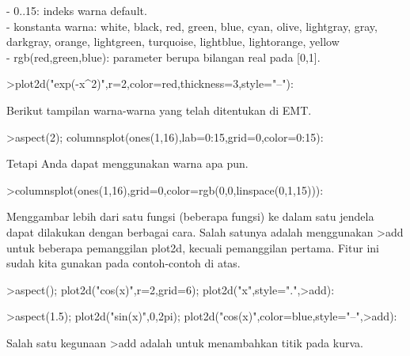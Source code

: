 \documentclass[a4paper,10pt]{article}
\begin{document}
\begin{eulernotebook}
\begin{eulercomment}
\begin{eulercomment}
\begin{eulercomment}
\begin{eulercomment}
\begin{eulercomment}
\begin{eulercomment}
\begin{eulercomment}
- 0..15: indeks warna default.\\
- konstanta warna: white, black, red, green, blue, cyan, olive,
lightgray, gray, darkgray, orange, lightgreen, turquoise, lightblue,
lightorange, yellow\\
- rgb(red,green,blue): parameter berupa bilangan real pada [0,1].
\end{eulercomment}
\begin{eulerprompt}
>plot2d("exp(-x^2)",r=2,color=red,thickness=3,style="--"):
\end{eulerprompt}
\begin{eulercomment}
Berikut tampilan warna-warna yang telah ditentukan di EMT.
\end{eulercomment}
\begin{eulerprompt}
>aspect(2); columnsplot(ones(1,16),lab=0:15,grid=0,color=0:15):
\end{eulerprompt}
\begin{eulercomment}
Tetapi Anda dapat menggunakan warna apa pun.
\end{eulercomment}
\begin{eulerprompt}
>columnsplot(ones(1,16),grid=0,color=rgb(0,0,linspace(0,1,15))):
\end{eulerprompt}
\begin{eulercomment}
Menggambar lebih dari satu fungsi (beberapa fungsi) ke dalam satu jendela dapat
dilakukan dengan berbagai cara. Salah satunya adalah menggunakan \textgreater{}add untuk beberapa
pemanggilan plot2d, kecuali pemanggilan pertama. Fitur ini sudah kita gunakan pada
contoh-contoh di atas.
\end{eulercomment}
\begin{eulerprompt}
>aspect(); plot2d("cos(x)",r=2,grid=6); plot2d("x",style=".",>add):
\end{eulerprompt}
\begin{eulerprompt}
>aspect(1.5); plot2d("sin(x)",0,2pi); plot2d("cos(x)",color=blue,style="--",>add):
\end{eulerprompt}
\begin{eulercomment}
Salah satu kegunaan \textgreater{}add adalah untuk menambahkan titik pada kurva.
\end{eulercomment}
\begin{eulerprompt}

\end{eulerprompt}
\end{eulercomment}
\end{eulercomment}
\end{eulercomment}
\end{eulercomment}
\end{eulercomment}
\end{eulercomment}
\end{eulernotebook}
\end{document}
